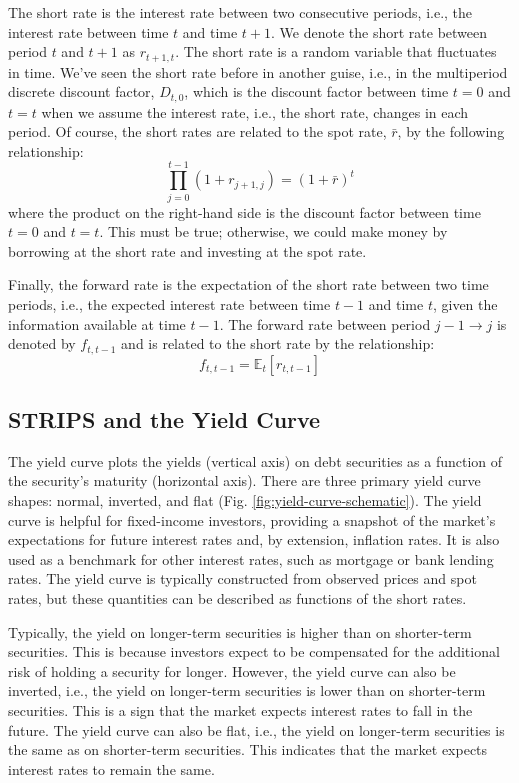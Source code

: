 \documentclass[11pt]{article}
\theoremstyle{definition}
\begin{document}
The short rate is the interest rate between two consecutive periods, i.e., the interest rate between time $t$ and time $t+1$. We denote the short rate between period $t$ and $t+1$ as $r_{t+1,t}$. The short rate is a random variable that fluctuates in time. We've seen the short rate before in another guise, i.e., in the multiperiod discrete discount factor, $D_{t,0}$, which is the discount factor between time $t = 0$ and $t = t$ when we assume the 
interest rate, i.e., the short rate, changes in each period. Of course, the short rates are related to the spot rate, $\bar{r}$, by the following relationship:
\begin{equation}
\prod_{j=0}^{t-1}\left(1+r_{j+1,j}\right) = \left(1+\bar{r}\right)^{t}
\end{equation}
where the product on the right-hand side is the discount factor between time $t = 0$ and $t = t$.
This must be true; otherwise, we could make money by borrowing at the short rate and investing at the spot rate.

Finally, the forward rate is the expectation of the short rate between two time periods, i.e., the expected interest rate between time $t-1$ and time $t$, given the information available at time $t-1$. 
The forward rate between period $j-1\rightarrow{j}$ is denoted by $f_{t,t-1}$ and is related to the short rate by the relationship:
\begin{equation}
	f_{t,t-1} = \mathbb{E}_{t}\left[r_{t,t-1}\right]
\end{equation}

\subsection{STRIPS and the Yield Curve}
The yield curve plots the yields (vertical axis) on debt securities as a function of the security's maturity (horizontal axis). 
There are three primary yield curve shapes: normal, inverted, and flat (Fig. \ref{fig:yield-curve-schematic}).
The yield curve is helpful for fixed-income investors, providing a snapshot of the market's expectations for future interest rates and, by extension, inflation rates. It is also used as a benchmark for other interest rates, such as mortgage or bank lending rates. The yield curve is typically constructed from observed prices and spot rates, but these quantities can be described as functions of the short rates. 

Typically, the yield on longer-term securities is higher than on shorter-term securities. This is because investors expect to be compensated for the additional risk of holding a security for longer. However, the yield curve can also be inverted, i.e., the yield on longer-term securities is lower than on shorter-term securities. This is a sign that the market expects interest rates to fall in the future. The yield curve can also be flat, i.e., the yield on longer-term securities is the same as on shorter-term securities. This indicates that the market expects interest rates to remain the same.
\end{document}
